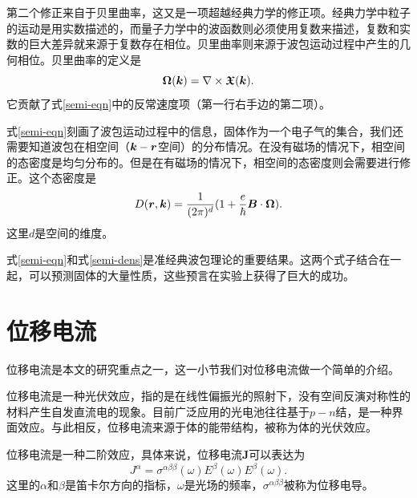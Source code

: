 第二个修正来自于贝里曲率，这又是一项超越经典力学的修正项。经典力学中粒子的运动是用实数描述的，而量子力学中的波函数则必须使用复数来描述，复数和实数的巨大差异就来源于复数存在相位。贝里曲率则来源于波包运动过程中产生的几何相位。贝里曲率的定义是
\begin{equation}
\boldsymbol{\Omega}(\boldsymbol{k}) = \nabla\times\boldsymbol{\mathfrak{X}}(\boldsymbol{k}).
\end{equation}
它贡献了式\ref{semi-eqn}中的反常速度项（第一行右手边的第二项）。

式\ref{semi-eqn}刻画了波包运动过程中的信息，固体作为一个电子气的集合，我们还需要知道波包在相空间（$\boldsymbol{k}-\boldsymbol{r}$空间）的分布情况。在没有磁场的情况下，相空间的态密度是均匀分布的。但是在有磁场的情况下，相空间的态密度则会需要进行修正。这个态密度是
\begin{equation}
D(\boldsymbol{r},\boldsymbol{k})=\frac{1}{(2\pi)^d}(1+\frac{e}{\hbar}\boldsymbol{B}\cdot\boldsymbol{\Omega}).\label{semi-dens}
\end{equation}
这里$d$是空间的维度。

式\ref{semi-eqn}和式\ref{semi-dens}是准经典波包理论的重要结果。这两个式子结合在一起，可以预测固体的大量性质，这些预言在实验上获得了巨大的成功。

\section{位移电流}

位移电流\cite{tan_shift_2016}是本文的研究重点之一，这一小节我们对位移电流做一个简单的介绍。

位移电流是一种光伏效应，指的是在线性偏振光的照射下，没有空间反演对称性的材料产生自发直流电的现象。目前广泛应用的光电池往往基于$p-n$结，是一种界面效应。与此相反，位移电流来源于体的能带结构，被称为体的光伏效应。

位移电流是一种二阶效应，具体来说，位移电流$\boldsymbol{J}$可以表达为
\begin{equation}
J^\alpha = \sigma^{\alpha\beta\beta}(\omega) E^\beta(\omega) E^\beta(\omega).
\end{equation}
这里的$\alpha$和$\beta$是笛卡尔方向的指标，$\omega$是光场的频率，$\sigma^{\alpha\beta\beta}$被称为位移电导。

